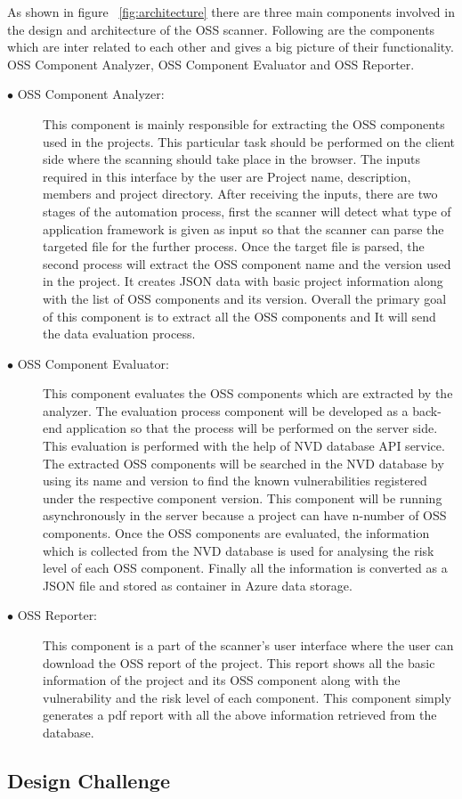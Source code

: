 As shown in figure ~\ref{fig:architecture} there are three main components involved in the design and architecture of the \acs{OSS} scanner. Following are the components which are inter related to each other and gives a big picture of their functionality. \acs{OSS} Component Analyzer, \acs{OSS} Component Evaluator and \acs{OSS} Reporter.
\begin{description}
	\item [$\bullet$ OSS Component Analyzer:] This component is mainly responsible for extracting the \acs{OSS} components used in the projects. This particular task should be performed on the client side where the scanning should take place in the browser. The inputs required in this interface by the user are Project name, description, members and project directory. After receiving the inputs, there are two stages of the automation process, first the scanner will detect what type of application framework is given as input so that the scanner can parse the targeted file for the further process. Once the target file is parsed, the second process will extract the \acs{OSS} component name and the version used in the project. It creates \acs{JSON} data with basic project information along with the list of \acs{OSS} components and its version. Overall the primary goal of this component is to extract all the \acs{OSS} components and It will send the data evaluation process.
	
	\item [$\bullet$ OSS Component Evaluator:] This component evaluates the \acs{OSS} components which are extracted by the analyzer. The evaluation process component will be developed as a back-end application so that the process will be performed on the server side. This evaluation is performed with the help of \acs{NVD} database \acs{API} service. The extracted \acs{OSS} components will be searched in the \acs{NVD} database by using its name and version to find the known vulnerabilities registered under the respective component version. This component will be running asynchronously in the server because a project can have n-number of \acs{OSS} components. Once the \acs{OSS} components are evaluated, the information which is collected from the \acs{NVD} database is used for analysing the risk level of each \acs{OSS} component. Finally all the information is converted as a \acs{JSON} file and stored as container in Azure data storage.
	
	\item [$\bullet$ OSS Reporter:] This component is a part of the scanner’s user interface where the user can download the \acs{OSS} report of the project. This report shows all the basic information of the project and its \acs{OSS} component along with the vulnerability and the risk level of each component. This component simply generates a pdf report with all the above information retrieved from the database.
	
\end{description}
\subsection{Design Challenge}
%
